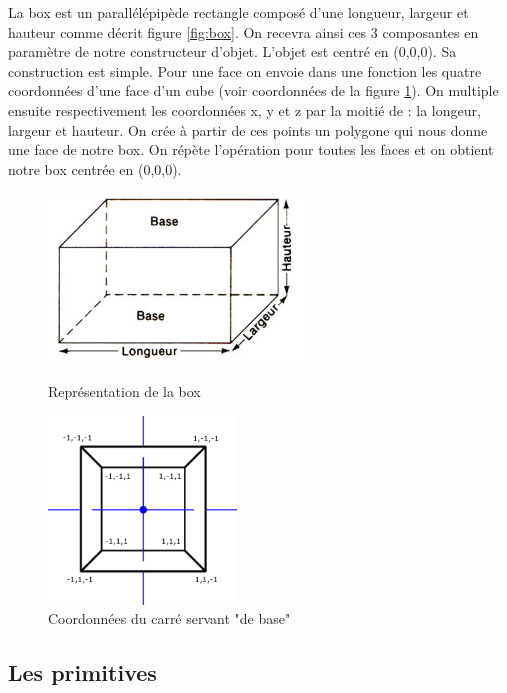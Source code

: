 \documentclass{article}
\begin{document}
La box est un parallélépipède rectangle composé d'une longueur, largeur et hauteur comme décrit figure \ref{fig:box}. On recevra ainsi ces 3 composantes en paramètre de notre constructeur d'objet. L'objet est centré en (0,0,0). Sa construction est simple. Pour une face on envoie dans une fonction les quatre coordonnées d'une face d'un cube (voir coordonnées de la figure \ref{fig:box_construction}). On multiple ensuite respectivement les coordonnées x, y et z par la moitié de : la longeur, largeur et hauteur. On crée à partir de ces points un polygone qui nous donne une face de notre box. On répète l'opération pour toutes les faces et on obtient notre box centrée en (0,0,0).


\begin{figure}[!htb]
	\begin{minipage}{0.5\textwidth}
    	\centering
    	\includegraphics[height=4.5cm]{./assets/box.jpg}
    	\caption{Représentation de la box}
    	\label{fig:box}
	\end{minipage}
	\hfill
	\begin{minipage}{0.5\textwidth}
    	\centering
    	\includegraphics[height=5cm]{./assets/box_construction.png}
    	\caption{Coordonnées du carré servant "de base"}
    	\label{fig:box_construction}
	\end{minipage}
\end{figure}

\subsection{Les primitives}
\end{document}
